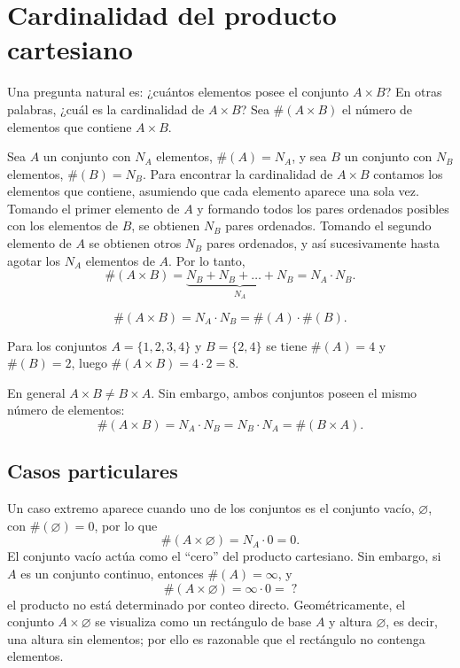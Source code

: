\section{Cardinalidad del producto cartesiano}

Una pregunta natural es: ¿cuántos elementos posee el conjunto $A \times B$?
En otras palabras, ¿cuál es la cardinalidad de $A \times B$? Sea
$\#(A\times B)$ el número de elementos que contiene $A \times B$.

Sea $A$ un conjunto con $N_A$ elementos, $\#(A) = N_A$, y sea $B$ un
conjunto con $N_B$ elementos, $\#(B) = N_B$. Para encontrar la cardinalidad
de $A \times B$ contamos los elementos que contiene, asumiendo que cada
elemento aparece una sola vez. Tomando el primer elemento de $A$ y formando
todos los pares ordenados posibles con los elementos de $B$, se obtienen
$N_B$ pares ordenados. Tomando el segundo elemento de $A$ se obtienen otros
$N_B$ pares ordenados, y así sucesivamente hasta agotar los $N_A$ elementos
de $A$. Por lo tanto,
\[
\#(A \times B) = \underbrace{N_B + N_B + \dots + N_B}_{N_A} = N_A \cdot N_B .
\]

\begin{proposicionc}
\[
\#(A \times B) = N_A \cdot N_B = \#(A)\cdot\#(B).
\]
\end{proposicionc}

\begin{ejemplo}
Para los conjuntos $A=\{1,2,3,4\}$ y $B=\{2,4\}$ se tiene $\#(A) = 4$ y
$\#(B) = 2$, luego $\#(A\times B) = 4\cdot 2 = 8$.
\end{ejemplo}

\begin{proposicionc}
En general $A \times B \neq B \times A$. Sin embargo, ambos conjuntos
poseen el mismo número de elementos:
\[
\#(A \times B) = N_A \cdot N_B = N_B \cdot N_A = \#(B \times A).
\]
\end{proposicionc}

\subsection{Casos particulares}

Un caso extremo aparece cuando uno de los conjuntos es el conjunto vacío,
$\varnothing$, con $\#(\varnothing) = 0$, por lo que
\[
\#(A \times \varnothing) = N_A \cdot 0 = 0.
\]
El conjunto vacío actúa como el ``cero'' del producto cartesiano. Sin
embargo, si $A$ es un conjunto continuo, entonces $\#(A) = \infty$, y
\[
\#(A \times \varnothing) = \infty \cdot 0 = \; ?
\]
el producto no está determinado por conteo directo. Geométricamente, el
conjunto $A \times \varnothing$ se visualiza como un rectángulo de base $A$
y altura $\varnothing$, es decir, una altura sin elementos; por ello es
razonable que el rectángulo no contenga elementos.

